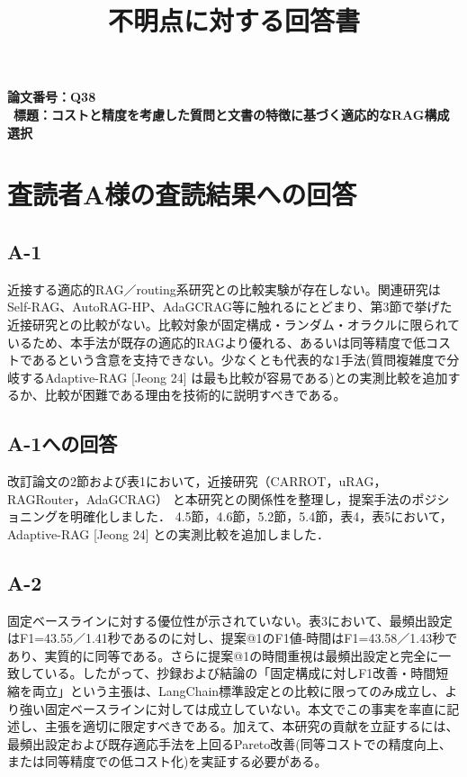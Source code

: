 \documentclass{jsarticle}
\title{不明点に対する回答書}
\author{\empty}
\date{\empty}
\begin{document}
\maketitle
\noindent \textbf{論文番号：Q38} \\\
\noindent \textbf{標題：コストと精度を考慮した質問と文書の特徴に基づく適応的なRAG構成選択}  \\


\newpage

\section*{査読者A様の査読結果への回答}

\subsection*{A-1}
\begin{screen}
近接する適応的RAG／routing系研究との比較実験が存在しない。関連研究はSelf-RAG、AutoRAG-HP、AdaGCRAG等に触れるにとどまり、第3節で挙げた近接研究との比較がない。比較対象が固定構成・ランダム・オラクルに限られているため、本手法が既存の適応的RAGより優れる、あるいは同等精度で低コストであるという含意を支持できない。少なくとも代表的な1手法(質問複雑度で分岐するAdaptive-RAG [Jeong 24] は最も比較が容易である)との実測比較を追加するか、比較が困難である理由を技術的に説明すべきである。
\end{screen}

\subsection*{A-1への回答}
改訂論文の2節および表1において，近接研究（CARROT，uRAG，RAGRouter，AdaGCRAG）
と本研究との関係性を整理し，提案手法のポジショニングを明確化しました．
4.5節，4.6節，5.2節，5.4節，表4，表5において，Adaptive-RAG [Jeong 24] との実測比較を追加しました．

\subsection*{A-2}
\begin{screen}
固定ベースラインに対する優位性が示されていない。表3において、最頻出設定はF1=43.55／1.41秒であるのに対し、提案@1のF1値-時間はF1=43.58／1.43秒であり、実質的に同等である。さらに提案@1の時間重視は最頻出設定と完全に一致している。したがって、抄録および結論の「固定構成に対しF1改善・時間短縮を両立」という主張は、LangChain標準設定との比較に限ってのみ成立し、より強い固定ベースラインに対しては成立していない。本文でこの事実を率直に記述し、主張を適切に限定すべきである。加えて、本研究の貢献を立証するには、最頻出設定および既存適応手法を上回るPareto改善(同等コストでの精度向上、または同等精度での低コスト化)を実証する必要がある。
\end{screen}
\end{document}
